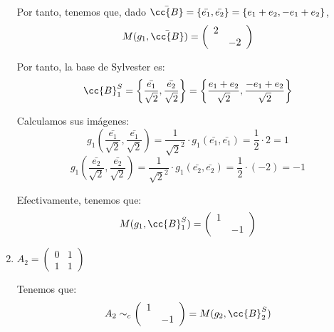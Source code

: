\begin{ejercicio}
\begin{enumerate}
        Por tanto, tenemos que, dado $\bar{\cc{B}} = \{\bar{e_1},\bar{e_2}\} = \{e_1+e_2, -e_1+e_2\}$,
        \begin{equation*}
            M(g_1, \bar{\cc{B}}) = \left(\begin{array}{cc}
            2 &  \\
             & -2
        \end{array} \right)
        \end{equation*}

        Por tanto, la base de Sylvester es:
        \begin{equation*}
            \cc{B}_1^S = \left\{\frac{\bar{e_1}}{\sqrt{2}},\frac{\bar{e_2}}{\sqrt{2}} \right\} = \left\{\frac{e_1+e_2}{\sqrt{2}},\frac{-e_1 + e_2}{\sqrt{2}} \right\}
        \end{equation*}

        Calculamos sus imágenes:
        \begin{equation*}
            g_1 \left(\frac{\bar{e_1}}{\sqrt{2}},\frac{\bar{e_1}}{\sqrt{2}}\right) = \frac{1}{\sqrt{2}^2} \cdot g_1(\bar{e_1}, \bar{e_1}) = \frac{1}{2}\cdot 2 = 1
        \end{equation*}
        \begin{equation*}
            g_1 \left(\frac{\bar{e_2}}{\sqrt{2}},\frac{\bar{e_2}}{\sqrt{2}}\right) = \frac{1}{\sqrt{2}^2} \cdot g_1(\bar{e_2}, \bar{e_2}) = \frac{1}{2}\cdot (-2) = -1
        \end{equation*}

        Efectivamente, tenemos que:
        \begin{equation*}
            M(g_1, \cc{B}_{1}^S) = \left(\begin{array}{cc}
                1 &  \\
                & -1
            \end{array} \right)
        \end{equation*}

        \item $A_2=\left(\begin{array}{cc}
            0 & 1 \\
            1 & 1
        \end{array} \right)$
        
        Tenemos que:
        \begin{equation*}
            A_2 \sim_c \left(\begin{array}{cc}
                1 &  \\
                & -1
            \end{array} \right) = M(g_2, \cc{B}_{2}^S)
        \end{equation*}
        

\end{enumerate}
\end{ejercicio}
